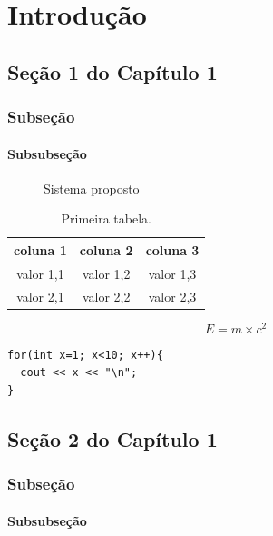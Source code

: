 \chapter{Introdu\c{c}\~{a}o}

\section{Se\c{c}\~{a}o 1 do Capítulo 1}
\subsection{Subseção}
\subsubsection{Subsubseção}


\begin{figure}[htbp]	
\begin{center}
	\end{center}
	\caption{Sistema proposto}
	\label{fig:sistemaProposto}
\end{figure}

\begin{table}[htpb]
\begin{center}
\begin{tabular}{|c|c|c|}
\hline
coluna 1 & coluna 2 & coluna 3 \\
\hline
valor 1,1 & valor 1,2 & valor 1,3 \\
valor 2,1 & valor 2,2 & valor 2,3 \\
\hline
\end{tabular}
\end{center}
\caption{Primeira tabela.}
\label{tab:tabelaTeste}
\end{table}

\begin{equation}
E = m \times c^2
\label{eq1}
\end{equation}

\begin{lstlisting}[caption={Loop simples},label=cod1,numbers=none]
for(int x=1; x<10; x++){
  cout << x << "\n";
}
\end{lstlisting}

\section{Se\c{c}\~{a}o 2 do Capítulo 1}  
\subsection{Subseção}
\subsubsection{Subsubseção}

